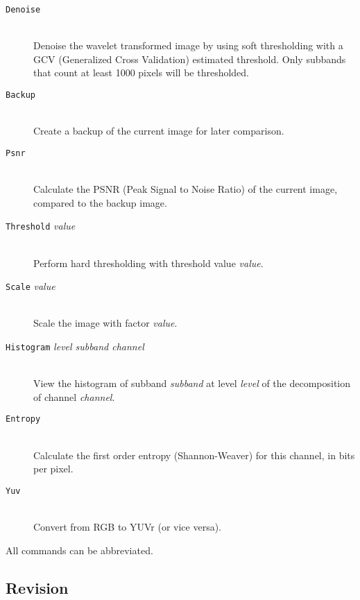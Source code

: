 \begin{description}
\item[\texttt{Denoise}]\mbox{}\\
    Denoise the wavelet transformed image by using soft thresholding with a GCV
    (Generalized Cross Validation) estimated threshold. Only subbands that
    count at least 1000 pixels will be thresholded.
\item[\texttt{Backup}]\mbox{}\\
    Create a backup of the current image for later comparison.
\item[\texttt{Psnr}]\mbox{}\\
    Calculate the PSNR (Peak Signal to Noise Ratio) of the current image,
    compared to the backup image.
\item[\texttt{Threshold} \emph{value}]\mbox{}\\
    Perform hard thresholding with threshold value \emph{value}.
\item[\texttt{Scale} \emph{value}]\mbox{}\\
    Scale the image with factor \emph{value}.
\item[\texttt{Histogram} \emph{level subband channel}]\mbox{}\\
    View the histogram of subband \emph{subband} at level \emph{level} of the
    decomposition of channel \emph{channel}.
\item[\texttt{Entropy}]\mbox{}\\
    Calculate the first order entropy (Shannon-Weaver) for this channel,
    in bits per pixel.
\item[\texttt{Yuv}]\mbox{}\\
    Convert from RGB to YUVr (or vice versa).
\end{description}

All commands can be abbreviated.

\subsection*{Revision}

